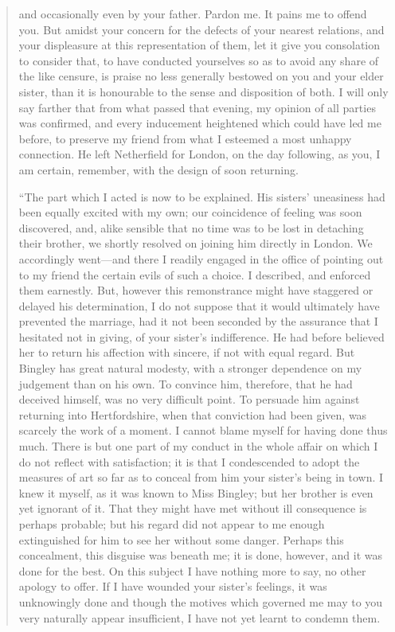 \documentclass[12pt,english,oneside]{book}
\begin{document}
\begin{quotation}
and occasionally even by your father. Pardon me. It pains me to offend
you. But amidst your concern for the defects of your nearest relations,
and your displeasure at this representation of them, let it give you
consolation to consider that, to have conducted yourselves so as to
avoid any share of the like censure, is praise no less generally bestowed
on you and your elder sister, than it is honourable to the sense and
disposition of both. I will only say farther that from what passed
that evening, my opinion of all parties was confirmed, and every inducement
heightened which could have led me before, to preserve my friend from
what I esteemed a most unhappy connection. He left Netherfield for
London, on the day following, as you, I am certain, remember, with
the design of soon returning.

{}``The part which I acted is now to be explained. His sisters' uneasiness
had been equally excited with my own; our coincidence of feeling was
soon discovered, and, alike sensible that no time was to be lost in
detaching their brother, we shortly resolved on joining him directly
in London. We accordingly went\mbox{---}and there I readily engaged
in the office of pointing out to my friend the certain evils of such
a choice. I described, and enforced them earnestly. But, however this
remonstrance might have staggered or delayed his determination, I
do not suppose that it would ultimately have prevented the marriage,
had it not been seconded by the assurance that I hesitated not in
giving, of your sister's indifference. He had before believed her
to return his affection with sincere, if not with equal regard. But
Bingley has great natural modesty, with a stronger dependence on my
judgement than on his own. To convince him, therefore, that he had
deceived himself, was no very difficult point. To persuade him against
returning into Hertfordshire, when that conviction had been given,
was scarcely the work of a moment. I cannot blame myself for having
done thus much. There is but one part of my conduct in the whole affair
on which I do not reflect with satisfaction; it is that I condescended
to adopt the measures of art so far as to conceal from him your sister's
being in town. I knew it myself, as it was known to Miss Bingley;
but her brother is even yet ignorant of it. That they might have met
without ill consequence is perhaps probable; but his regard did not
appear to me enough extinguished for him to see her without some danger.
Perhaps this concealment, this disguise was beneath me; it is done,
however, and it was done for the best. On this subject I have nothing
more to say, no other apology to offer. If I have wounded your sister's
feelings, it was unknowingly done and though the motives which governed
me may to you very naturally appear insufficient, I have not yet learnt
to condemn them.


\end{quotation}
\end{document}
